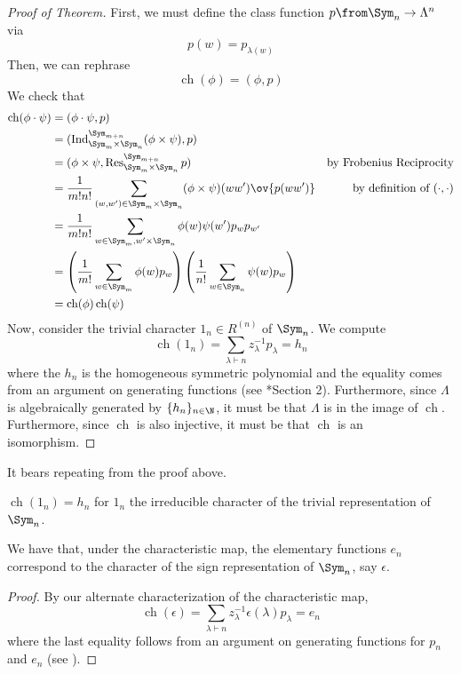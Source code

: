 \documentclass[11pt,leqno,oneside]{amsart}
\numberwithin{thm}{section}
\newcommand{\partitionof}{\vdash}
\newcommand{\sym}{\Lambda}
\newcommand{\ch}{\operatorname{ch}}
\newcommand{\Ind}{\operatorname{Ind}}
\newcommand{\Res}{\operatorname{Res}}
\begin{document}
\begin{proof}[Proof of Theorem]
  First, we must define the class function \(p \from \Sym_n \to
  \sym^n\) via \[ 
    p(w) = p_{\lambda(w)}
  \]
  Then, we can rephrase \[
    \ch(\phi) =  (\phi, p)
  \]
  We check that
  \begin{align*}
    \ch(\phi \cdot \psi)
    & = ( \phi \cdot \psi, p)\\
    & = (\Ind_{\Sym_m \times \Sym_n}^{\Sym_{m+n}}(\phi \times
      \psi), p) \\
    & = (\phi \times \psi, \Res_{\Sym_m \times
      \Sym_n}^{\Sym_{m+n}}p)
    & \text{by Frobenius Reciprocity}\\
    & = \frac{1}{m!n!} \sum_{(w,w') \in \Sym_m \times \Sym_n} (\phi \times
      \psi)(ww') \ov{p(ww')}
    & \text{by definition of }(\cdot,\cdot)\\
    & = \frac{1}{m!n!} \sum_{w \in \Sym_m, w' \times \Sym_n} \phi(w)
      \psi(w') p_{w} p_{w'} \\
    & = \left( \frac{1}{m!} \sum_{w \in \Sym_m} \phi(w) p_w
      \right)\left( \frac{1}{n!} \sum_{w \in \Sym_n} \psi(w) p_w
      \right) \\
    & = \ch(\phi) \ch(\psi)
  \end{align*}
  Now, consider the trivial character \(1_n \in R^{(n)}\) of
  \(\Sym_n\). We compute \[
    \ch(1_n) = \sum_{\lambda \partitionof n} z_\lambda^{-1}
    p_\lambda = h_n
  \]
  where the \(h_n\) is the homogeneous symmetric polynomial and the
  equality comes from an argument on generating functions (see
  \cite{alg-comb}*{Section 2}). Furthermore, since \(\sym\) is
  algebraically generated by \(\{h_n\}_{n \in \N}\), it must be that
  \(\sym\) is in the image of \(\ch\). Furthermore, since \(\ch\) is
  also injective, it must be that \(\ch\) is an isomorphism.
\end{proof}
It bears repeating from the proof above.
\begin{cor}
   \(\ch(1_n) = h_n\) for \(1_n\) the irreducible
   character of the trivial representation of \(\Sym_n\).
\end{cor}
\begin{prop}
  We have that, under the characteristic map, the elementary functions
  \(e_n\) correspond to the character of the sign representation of
  \(\Sym_n\), say \(\epsilon\). 
\end{prop}
\begin{proof}
  By our alternate characterization of the characteristic map, \[
    \ch(\epsilon) = \sum_{\lambda \partitionof n} z_\lambda^{-1}
    \epsilon(\lambda) p_\lambda = e_n
  \]
  where the last equality follows from an argument on generating
  functions for \(p_n\) and \(e_n\) (see \cite{alg-comb}).
\end{proof}
\end{document}
